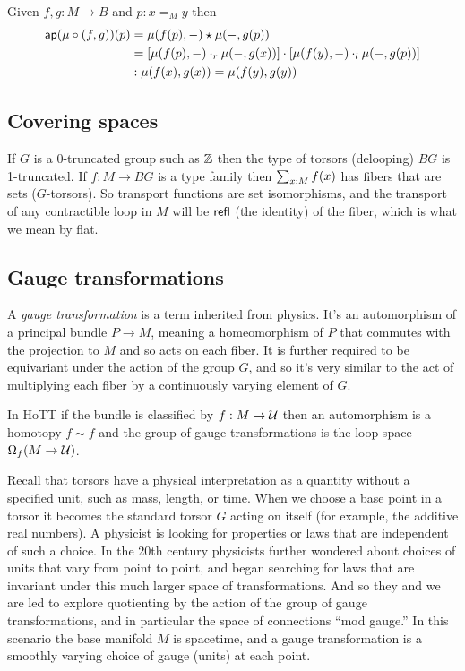 \begin{mylemma}
Given \( f, g:M\to B \) and \( p:x=_M y \) then 
\begin{align*}
 \mathsf{ap}(\mu\circ(f,g))(p)&=\mu(f(p),-)\star\mu(-,g(p))\\
 &=\left[\mu(f(p),-)\cdot_r \mu(-,g(x))\right]\cdot \left[\mu(f(y),-)\cdot_l\mu(-,g(p))\right]\\
 &:\mu(f(x),g(x))=\mu(f(y),g(y))
\end{align*}
\end{mylemma}

\subsection{Covering spaces}

If \( G \) is a 0-truncated group such as \( \mathbb{Z} \) then the type of torsors (delooping) \( BG \) is 1-truncated. If \( f:M\to BG \) is a type family then \( \sum_{x:M}f(x) \) has fibers that are sets (\( G \)-torsors). So transport functions are set isomorphisms, and the transport of any contractible loop in \( M \) will be \( \mathsf{refl} \) (the identity) of the fiber, which is what we mean by flat.

\subsection{Gauge transformations}

A \emph{gauge transformation} is a term inherited from physics. It's an automorphism of a principal bundle \( P\to M \), meaning a homeomorphism of \( P \) that commutes with the projection to \( M \) and so acts on each fiber. It is further required to be equivariant under the action of the group \( G \), and so it's very similar to the act of multiplying each fiber by a continuously varying element of \( G \).

In HoTT if the bundle is classified by \( f:M\to \mathcal{U} \) then an automorphism is a homotopy \( f\sim f \) and the group of gauge transformations is the loop space \( \Omega_f(M\to \mathcal{U}) \). 

Recall that torsors have a physical interpretation as a quantity without a specified unit, such as mass, length, or time. When we choose a base point in a torsor it becomes the standard torsor \( G \) acting on itself (for example, the additive real numbers). A physicist is looking for properties or laws that are independent of such a choice. In the 20th century physicists further wondered about choices of units that vary from point to point, and began searching for laws that are invariant under this much larger space of transformations. And so they and we are led to explore quotienting by the action of the group of gauge transformations, and in particular the space of connections ``mod gauge.'' In this scenario the base manifold \( M \) is spacetime, and a gauge transformation is a smoothly varying choice of gauge (units) at each point.

